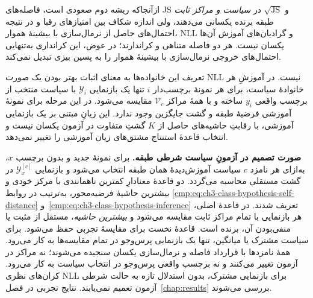 ازآنجاکه ریشه دوم صعودی است،
فاصله‌های JS و $\sqrt{\mathrm{JS}}$ در
\emph{سیاست و مراکز ثابت} طبقه برنده یکسانی
می‌دهند، ولی اندازه شکاف بین امتیازهای رقبا
و در نتیجه احتمال‌های حاصل از نرمال‌سازی با بیشینهٔ هموار، NLL و گرادیان‌های آموزش
آن‌ها یکسان نیست. هر دو فاصله متناهی و کراندارند؛
در عوض، این کرانداری به‌تنهایی احتمال‌های
خروجی نرمال‌سازی با بیشینهٔ هموار را به پسین بیزی تبدیل نمی‌کند.

تعریف این خانواده‌ها به معنای اثبات بهتر بودن
یک صورت NLL نیست. در آموزشِ هر خانوادهٔ سیاست،
برای هر نمونهٔ برچسب‌دار $i$ تنها یک
بازنمایی $\mathscr Y_i$ با سیاست
منتخب از برچسب واقعی $y_i$ ساخته و با
همهٔ مراکز $\mathcal V_c$ مقایسه می‌شود.
در این مرحله برای نمونهٔ آموزشی فرضیهٔ
طبقه و گشت جایگزین وجود ندارد.
این زیانِ مبتنی بر یک بازنمایی آموزشی،
با رقابتِ حاشیه‌های حاصل از $K$ گشتِ متفاوت
در آزمون یکسان نیست و انتخاب قاعدهٔ استنتاج
مشتق‌های زیان آموزشی را تغییر نمی‌دهد.

\noindent\textbf{صورت تصمیم در آزمونِ سیاست شرطی طبقه.}
برای نمونهٔ جدید و بدون برچسب $x$،
به‌ازای هر نامزد $c$ سیاست آموزش‌دیدهٔ
همان طبقه انتخاب می‌شود و بازنمایی
$\mathscr Y_x^{[c]}$ در گشت مستقلی
محاسبه می‌گردد. دو قاعدهٔ معنادارِ کمترین
ناهمانندی با مرکز خودی و بیشترین حاشیهٔ
فرضیه‌محور، به‌ترتیب در روابط
\eqref{cmp:eq:ch3-class-hypothesis-self-distance}
و~\eqref{cmp:eq:ch3-class-hypothesis-inference}
تعریف شدند. در قاعدهٔ اصلی، هر بازنمایی
با تمام مراکز ثابت مقایسه می‌شود و
\emph{بیشترین حاشیه}، مستقل از مثبت یا
منفی‌بودن آن، برنده است. قاعدهٔ نخست
برای مقایسهٔ تجربی حفظ می‌شود.
برای سیاست مشترک یا میانگین، تنها
یک بازنمایی پرس‌وجو در تمام مقایسه‌ها
به کار می‌رود. همهٔ نامزدها با قرارداد
فاصله و نرمال‌سازی یکسان سنجیده می‌شوند؛
نه مراکز در آزمون تغییر می‌کنند و نه
برچسب واقعی پرس‌وجو در انتخاب سیاست
به کار می‌رود. کران‌های نظری NLL برای
بازنمایی مشترک، بدون استدلال تازه به
حالت شرطی آزمون تعمیم نمی‌یابند.
نتایج تجربی در فصل~\ref{chap:results}
بررسی می‌شوند.


